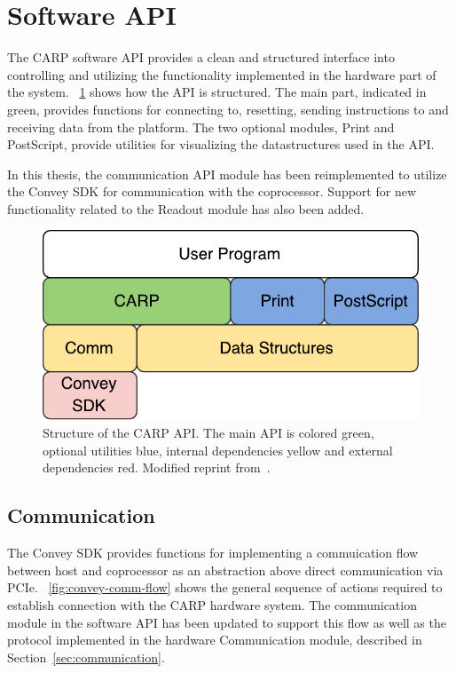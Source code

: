 \renewcommand{\arraystretch}{1}

\section{Software API}

The CARP software API provides a clean and structured interface into controlling
and utilizing the functionality implemented in the hardware part of the system.
\figurename~\ref{fig:sw-api} shows how the API is structured. The main part,
indicated in green, provides functions for connecting to, resetting, sending
instructions to and receiving data from the platform. The two optional modules,
Print and PostScript, provide utilities for visualizing the datastructures used
in the API.

In this thesis, the communication API module has been reimplemented to utilize
the Convey SDK for communication with the coprocessor. Support for new
functionality related to the Readout module has also been added.

\begin{figure}[H]
  \centering
  \includegraphics[width=0.5\linewidth]{fig/sw-api}
  \caption[CARP Software API]{
    Structure of the CARP API. The main API is colored green, optional utilities
    blue, internal dependencies yellow and external dependencies red. Modified
    reprint from~\cite{Lundal2015a}.
  }
  \label{fig:sw-api}
\end{figure}

\subsection{Communication}

The Convey SDK provides functions for implementing a commuication flow between
host and coprocessor as an abstraction above direct communication via PCIe.
\figurename~\ref{fig:convey-comm-flow} shows the general sequence of actions
required to establish connection with the CARP hardware system. The
communication module in the software API has been updated to support this flow
as well as the protocol implemented in the hardware Communication module, described in
Section~\ref{sec:communication}.

